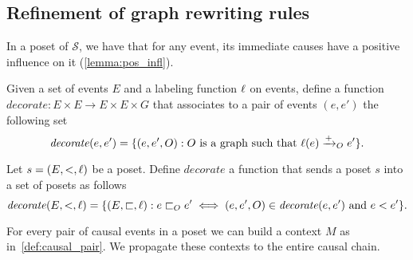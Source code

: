 

\subsection{Refinement of graph rewriting rules}

In a poset of $\mathcal{S}$, we have that for any event, its immediate causes have a positive influence on it (\autoref{lemma:pos_infl}).

\begin{definition}
   Given a set of events $E$ and a labeling function $\ell$ on events, define a function $\mathit{decorate}:E\times E \to E\times E\times G$ that associates to a pair of events $(e,e')$ the following set
    \[
    \mathit{decorate}(e,e') = \{(e,e',O) : O\text{ is a graph such that }\ell(e)\mathrel{\xrightarrow{+}}_O e'\}.
    \]

    Let $s = (E,<,\ell)$ be a poset. Define $\mathit{decorate}$ a function that sends a poset $s$ into a set of posets as follows
    \[
    \mathit{decorate}(E,<,\ell) =\{(E,\sqsubset,\ell) : e\sqsubset_O e' \iff (e,e',O)\in\mathit{decorate}(e,e')\text{ and }
    e<e'\}.
    \]
\end{definition}

For every pair of causal events in a poset we can build a context $M$ as in~\autoref{def:causal_pair}. We propagate these contexts to the entire causal chain.

